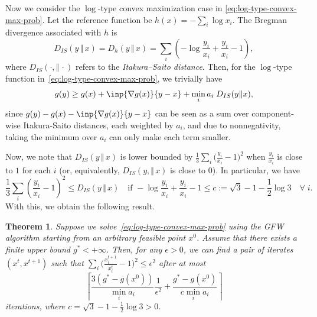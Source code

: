 \documentclass[format=acmsmall,authorversion]{acmart}
\newtheorem{theorem}{Theorem}
\begin{document}
Now we consider the $\log$-type convex maximization case in \cref{eq:log-type-convex-max-prob}.
Let the reference function be $h(x) = -\sum_i \log{x_i}$. The Bregman divergence associated with $h$ is
\begin{equation}
    D_{IS}(y\,\Vert\,x) = D_h(y\, \Vert\, x) = \sum_i \left( - \log{\frac{y_i}{x_i}} + \frac{y_i}{x_i} - 1 \right), 
\end{equation}
where $D_{IS}( \cdot, \Vert\, \cdot)$ refers to the \emph{Itakura–Saito distance}. Then, for the $\log$-type function in~\cref{eq:log-type-convex-max-prob}, we trivially have 
\begin{equation}
    g(y) \geq g(x) + \inp{\nabla g(x)}{y - x} + \min_i a_i \; D_{IS}(y\| x),
\end{equation}
since $g(y) - g(x) - \inp{\nabla g(x)}{y - x}$ can be seen as a sum over component-wise Itakura-Saito distances, each weighted by $a_i$, and due to nonnegativity, taking the minimum over $a_i$ can only make each term smaller.

Now, we note that $D_{IS}(y\,\Vert\,x)$ is lower bounded by $\frac{1}{3}\sum_i \big( \frac{y_i}{x_i} - 1 \big)^2$ when $\frac{y_i}{x_i}$ is close to $1$ for each $i$ (or, equivalently, $D_{IS}(y,\Vert\,x)$ is close to $0$). In particular, we have 
\begin{equation}
    \frac{1}{3}\sum_i \left( \frac{y_i}{x_i} - 1 \right)^2 \leq D_{IS}(y\,\Vert\,x) \quad \text{if } - \log{\frac{y_i}{x_i}} + \frac{y_i}{x_i} - 1  \leq c := \sqrt{3} - 1 - \frac{1}{2}\log{3} \quad\forall\; i.
    \label{eq:quadratic-function-lower-bound}
\end{equation}
With this, we obtain the following result. 

\begin{theorem} 
    Suppose we solve~\cref{eq:log-type-convex-max-prob} using the GFW algorithm starting from an arbitrary feasible point $x^0$. Assume that there exists a finite upper bound $g^* < +\infty$. Then, for any $\epsilon > 0$, we can find a pair of iterates $(x^t, x^{t + 1})$ such that $\sum_i \big( \frac{x^{t+1}_i}{x^t_i} - 1 \big)^2 \leq \epsilon^2$ after at most 
    $$\left\lceil\frac{3(g^* - g(x^0))}{\min_i a_i} \frac{1}{\epsilon^2} + \frac{g^* - g(x^0)}{c \min_i a_i}\right\rceil$$
    iterations, where $c = \sqrt{3} - 1 - \frac{1}{2}\log{3} > 0$. 
    \label{crl:stepsize-convergence-for-log-type-convex-max}
\end{theorem}
\end{document}
